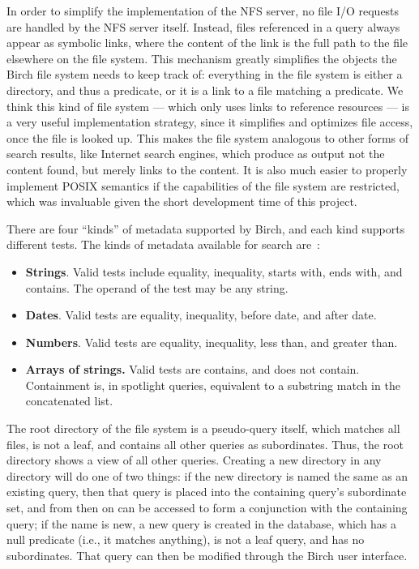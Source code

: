 \documentclass{article}
\begin{document}
In order to simplify the implementation of the NFS server, no file I/O
requests are handled by the NFS server itself. Instead, files
referenced in a query always appear as symbolic links, where the
content of the link is the full path to the file elsewhere on the file
system. This mechanism greatly simplifies the objects the Birch file
system needs to keep track of: everything in the file system is either
a directory, and thus a predicate, or it is a link to a file matching
a predicate. We think this kind of file system --- which only uses
links to reference resources --- is a very useful implementation
strategy, since it simplifies and optimizes file access, once the file
is looked up. This makes the file system analogous to other forms of
search results, like Internet search engines, which produce as output
not the content found, but merely links to the content. It is also
much easier to properly implement POSIX semantics if the capabilities
of the file system are restricted, which was invaluable given the
short development time of this project.

There are four ``kinds'' of metadata supported by Birch, and each kind
supports different tests. The kinds of metadata available for search
are~\cite{appleref:spotlight-metadata}:

\begin{itemize}
  \item\textbf{Strings}. Valid tests include equality, inequality,
    starts with, ends with, and contains. The operand of the test may
    be any string.

  \item\textbf{Dates}. Valid tests are equality, inequality, before
    date, and after date.

  \item\textbf{Numbers}. Valid tests are equality, inequality, less
    than, and greater than.

  \item\textbf{Arrays of strings.} Valid tests are contains, and does
    not contain. Containment is, in spotlight queries, equivalent to a
    substring match in the concatenated list.
\end{itemize}

The root directory of the file system is a pseudo-query itself, which
matches all files, is not a leaf, and contains all other queries as
subordinates. Thus, the root directory shows a view of all other
queries. Creating a new directory in any directory will do one of two
things: if the new directory is named the same as an existing query,
then that query is placed into the containing query's subordinate set,
and from then on can be accessed to form a conjunction with the
containing query; if the name is new, a new query is created in the
database, which has a null predicate (i.e., it matches anything), is
not a leaf query, and has no subordinates. That query can then be
modified through the Birch user interface.
\end{document}
